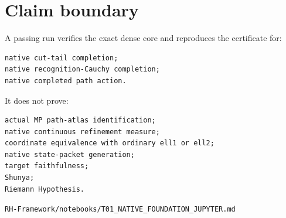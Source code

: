 \hypertarget{claim-boundary}{%
\section{Claim boundary}\label{claim-boundary}}

A passing run verifies the exact dense core and reproduces the certificate for:

\begin{verbatim}
native cut-tail completion;
native recognition-Cauchy completion;
native completed path action.
\end{verbatim}

It does not prove:

\begin{verbatim}
actual MP path-atlas identification;
native continuous refinement measure;
coordinate equivalence with ordinary ell1 or ell2;
native state-packet generation;
target faithfulness;
Shunya;
Riemann Hypothesis.
\end{verbatim}

\begin{flushright}\small\texttt{RH-Framework/notebooks/T01\_NATIVE\_FOUNDATION\_JUPYTER.md}\end{flushright}
